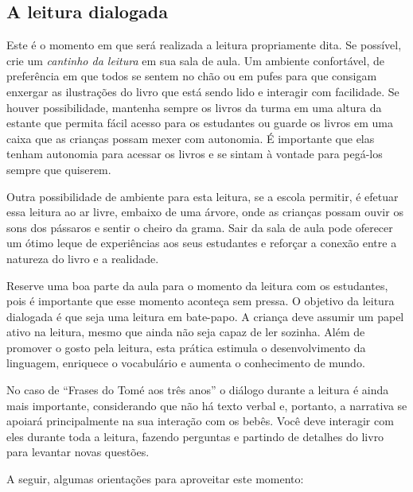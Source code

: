\documentclass[11pt]{extarticle}
\begin{document}
\subsection{A leitura dialogada}
Este é o momento em que será realizada a leitura propriamente dita. 
Se possível, crie um \textit{cantinho da leitura} em sua sala de aula. Um 
ambiente confortável, de preferência em que todos se sentem no chão ou 
em pufes para que consigam enxergar as ilustrações do livro que está 
sendo lido e interagir com facilidade. Se houver possibilidade, mantenha 
sempre os livros da turma em uma altura da estante que permita fácil 
acesso para os estudantes ou guarde os livros em uma caixa que as crianças 
possam mexer com autonomia. É importante que elas tenham autonomia para 
acessar os livros e se sintam à vontade para pegá-los sempre que quiserem. 

Outra possibilidade de ambiente para esta leitura, se a escola permitir, 
é efetuar essa leitura ao ar livre, embaixo de uma árvore, onde as crianças 
possam ouvir os sons dos pássaros e sentir o cheiro da grama. Sair da sala 
de aula pode oferecer um ótimo leque de experiências aos seus estudantes e 
reforçar a conexão entre a natureza do livro e a realidade.  

Reserve uma boa parte da aula para o momento da leitura com os estudantes, 
pois é importante que esse momento aconteça sem pressa. O objetivo da 
leitura dialogada é que seja uma leitura em bate-papo. A criança deve 
assumir um papel ativo na leitura, mesmo que ainda não seja capaz de 
ler sozinha. Além de promover o gosto pela leitura, esta prática estimula 
o desenvolvimento da linguagem, enriquece o vocabulário e 
aumenta o conhecimento de mundo.

No caso de “Frases do Tomé aos três anos” o diálogo durante a leitura é 
ainda mais importante, considerando que não há texto verbal e, 
portanto, a narrativa se apoiará principalmente na sua interação com os bebês. 
Você deve interagir com eles durante toda a 
leitura, fazendo perguntas e partindo de detalhes do livro para 
levantar novas questões. 

A seguir, algumas orientações para aproveitar este momento: 
\end{document}
